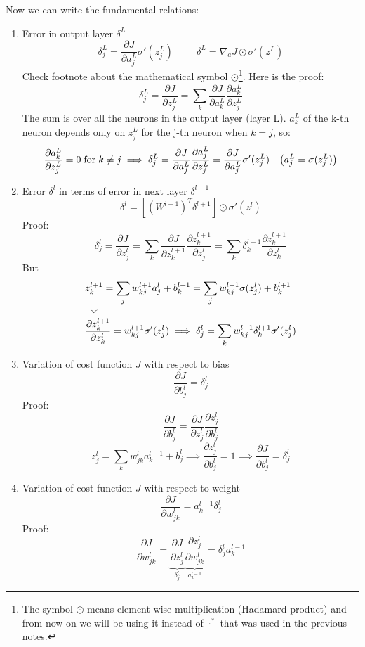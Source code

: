 Now we can write the fundamental relations:
\begin{enumerate}
    \item Error in output layer $\delta^L$
    \[
        \delta_j^L = \dfrac{\partial J}{\partial a_j^L} \sigma'(z_j^L) \hspace{1cm} \underline{\delta}^L = \nabla_a J \odot \sigma'(\underline{z}^L)    
    \]
    Check footnote about the mathematical symbol $\odot$\footnote[1]{The symbol $\odot$ means element-wise multiplication (Hadamard product) and from now on we will be using it instead of $\cdot^*$ that was used in the previous notes.}. Here is the proof:
    \[
        \delta_j^L = \dfrac{\partial J}{\partial z_j^L} = \sum_k \dfrac{\partial J}{\partial a_k^L} \dfrac{\partial a_k^L}{\partial z_j^L} 
    \]
    The sum is over all the neurons in the output layer (layer L). $a_k^L$ of the k-th neuron depends only on $z_j^L$ for the j-th neuron when $k=j$, so:
    \[
        \dfrac{\partial a_k^L}{\partial z_j^L} = 0 \hspace{0.1cm} \text{for} \hspace{0.1cm} k\neq j \implies \delta_j^L = \dfrac{\partial J}{\partial a_j^L} \dfrac{\partial a_j^L}{\partial z_j^L} = \dfrac{\partial J}{\partial a_j^L} \sigma'(z_j^L)    \hspace{0.3cm} \left(a_j^L = \sigma(z_j^L)\right)
    \]
    \item Error $\underline{\delta}^l$ in terms of error in next layer $\underline{\delta}^{l+1}$
    \[
        \underline{\delta}^l = \left[(W^{l+1})^T \underline{\delta}^{l+1}\right] \odot \sigma'(\underline{z}^l)    
    \]
    Proof:
    \[
        \delta_j^l = \dfrac{\partial J}{\partial z_j^l} = \sum_k \dfrac{\partial J}{\partial z_k^{l+1}} \dfrac{\partial z_k^{l+1}}{\partial z_j^l} = \sum_k  \delta_k^{l+1}  \dfrac{\partial z_k^{l+1}}{\partial z_k^l}
    \]
    But
    \[
        \begin{split}
            &\underset{\Big{\Downarrow} }{z_k^{l+1}} = \sum_j w_{kj}^{l+1} a_j^l + b_k^{l+1} = \sum_j w_{kj}^{l+1} \sigma(z_j^l) + b_k^{l+1} \\
            &\dfrac{\partial z_k^{l+1}}{\partial z_k^l} = w_{kj}^{l+1} \sigma'(z_j^l) \implies \delta_j^l = \sum_k w_{kj}^{l+1} \delta_k^{l+1} \sigma'(z_j^l)\\
        \end{split}
    \]
    \item Variation of cost function $J$ with respect to bias
    \[
        \dfrac{\partial J}{\partial b_j^l} = \delta_j^l
    \]
    Proof:
    \[
        \dfrac{\partial J}{\partial b_j^l} = \dfrac{\partial J}{\partial z_j^l} \dfrac{\partial z_j^l}{\partial b_j^l} 
    \]
    \[
        z_j^l = \sum_k w_{jk}^l a_k^{l-1} + b_j^l \implies \dfrac{\partial z_j^l}{\partial b_j^l} = 1 \implies \dfrac{\partial J}{\partial b_j^l} = \delta_j^l    
    \]
    \item Variation of cost function $J$ with respect to weight
    \[
        \dfrac{\partial J}{\partial w_{jk}^l} = a_k^{l-1} \delta_j^l
    \]
    Proof:
    \[
        \dfrac{\partial J}{\partial w_{jk}^l} = \underbrace{\dfrac{\partial J}{\partial z_j^l}}_{\delta_j^l} \underbrace{\dfrac{\partial z_j^l}{\partial w_{jk}^l}}_{a_k^{l-1}} = \delta_j^l a_k^{l-1}
    \]
\end{enumerate}
